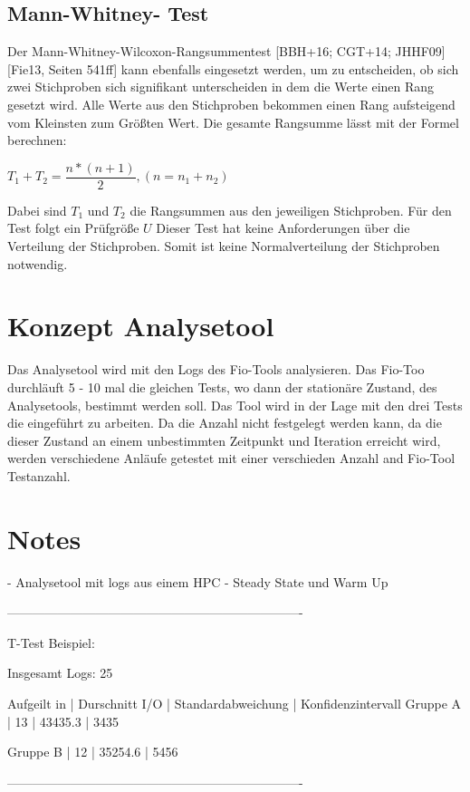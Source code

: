 \subsection{Mann-Whitney-
Test}
Der Mann-Whitney-Wilcoxon-Rangsummentest [BBH+16; CGT+14; JHHF09]
[Fie13, Seiten 541ff] kann ebenfalls eingesetzt werden, um zu entscheiden, ob sich zwei
Stichproben sich signifikant unterscheiden in dem die Werte einen Rang gesetzt wird. 
Alle Werte aus den Stichproben bekommen einen Rang aufsteigend vom Kleinsten zum Größten Wert.
Die gesamte Rangsumme lässt mit der Formel berechnen:
\begin{center}
  $T_1 + T_2 = \dfrac{n * (n + 1)}{2}, (n = n_1 + n_2)$
\end{center}  

Dabei sind $T_1$ und $T_2$ die Rangsummen aus den jeweiligen Stichproben.
Für den Test folgt ein Prüfgröße $U$  
Dieser Test
hat keine Anforderungen über die Verteilung der Stichproben.
Somit ist keine Normalverteilung der Stichproben notwendig.


\section{Konzept Analysetool}
Das Analysetool wird mit den Logs des Fio-Tools analysieren.
Das Fio-Too durchläuft 5 - 10 mal die gleichen Tests, wo dann der stationäre Zustand, des Analysetools,
bestimmt werden soll. Das Tool wird in der Lage mit den drei Tests die eingeführt zu arbeiten.
Da die Anzahl nicht festgelegt werden kann, da die dieser Zustand an einem unbestimmten Zeitpunkt und Iteration erreicht wird,
werden verschiedene Anläufe getestet mit einer verschieden Anzahl and Fio-Tool Testanzahl.

\section{Notes}

- Analysetool mit logs aus einem HPC
- Steady State und Warm Up

----------------------------------------------------------------------

T-Test Beispiel:

Insgesamt Logs: 25

Aufgeilt in 	| Durschnitt I/O | Standardabweichung | Konfidenzintervall
Gruppe A | 13	| 43435.3	 | 3435

Gruppe B | 12	| 35254.6	 | 5456	

----------------------------------------------------------------------


